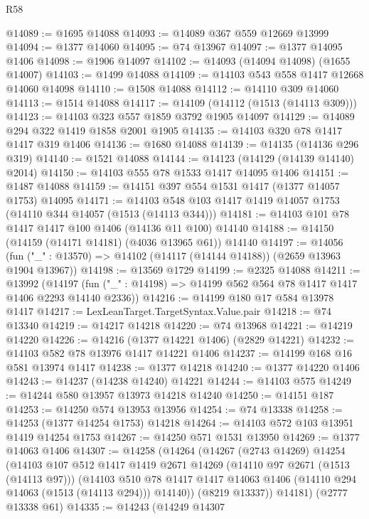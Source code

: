 \begin{lexlean}{R58}
\begin{coremodule}
{{@14089 := @1695 @14088
@14093 := @14089 @367 @559 @12669 @13999
@14094 := @1377 @14060
@14095 := @74 @13967
@14097 := @1377 @14095 @1406
@14098 := @1906 @14097
@14102 := @14093 (@14094 @14098) (@1655 @14007)
@14103 := @1499 @14088
@14109 := @14103 @543 @558 @1417 @12668 @14060 @14098
@14110 := @1508 @14088
@14112 := @14110 @309 @14060
@14113 := @1514 @14088
@14117 := @14109 (@14112 (@1513 (@14113 @309)))
@14123 := @14103 @323 @557 @1859 @3792 @1905 @14097
@14129 := @14089 @294 @322 @1419 @1858 @2001 @1905
@14135 := @14103 @320 @78 @1417 @1417 @319 @1406
@14136 := @1680 @14088
@14139 := @14135 (@14136 @296 @319)
@14140 := @1521 @14088
@14144 := @14123 (@14129 (@14139 @14140) @2014)
@14150 := @14103 @555 @78 @1533 @1417 @14095 @1406
@14151 := @1487 @14088
@14159 := @14151 @397 @554 @1531 @1417 (@1377 @14057 @1753) @14095
@14171 := @14103 @548 @103 @1417 @1419 @14057 @1753 (@14110 @344 @14057 (@1513 (@14113 @344)))
@14181 := @14103 @101 @78 @1417 @1417 @100 @1406 (@14136 @11 @100) @14140
@14188 := @14150 (@14159 (@14171 @14181) (@4036 @13965 @61)) @14140
@14197 := @14056 (fun ("_" : @13570) => @14102 (@14117 (@14144 @14188)) (@2659 @13963 @1904 @13967))
@14198 := @13569 @1729
@14199 := @2325 @14088
@14211 := @13992
    (@14197 (fun ("_" : @14198) => @14199 @562 @564 @78 @1417 @1417 @1406 @2293 @14140 @2336))
@14216 := @14199 @180 @17 @584 @13978 @1417
@14217 := LexLeanTarget.TargetSyntax.Value.pair
@14218 := @74 @13340
@14219 := @14217 @14218
@14220 := @74 @13968
@14221 := @14219 @14220
@14226 := @14216 (@1377 @14221 @1406) (@2829 @14221)
@14232 := @14103 @582 @78 @13976 @1417 @14221 @1406
@14237 := @14199 @168 @16 @581 @13974 @1417
@14238 := @1377 @14218
@14240 := @1377 @14220 @1406
@14243 := @14237 (@14238 @14240) @14221
@14244 := @14103 @575
@14249 := @14244 @580 @13957 @13973 @14218 @14240
@14250 := @14151 @187
@14253 := @14250 @574 @13953 @13956
@14254 := @74 @13338
@14258 := @14253 (@1377 @14254 @1753) @14218
@14264 := @14103 @572 @103 @13951 @1419 @14254 @1753
@14267 := @14250 @571 @1531 @13950
@14269 := @1377 @14063 @1406
@14307 := @14258
    (@14264
      (@14267
        (@2743 @14269)
        @14254
        (@14103
          @107
          @512
          @1417
          @1419
          @2671
          @14269
          (@14110 @97 @2671 (@1513 (@14113 @97)))
          (@14103
            @510
            @78
            @1417
            @1417
            @14063
            @1406
            (@14110 @294 @14063 (@1513 (@14113 @294)))
            @14140))
        (@8219 @13337))
      @14181)
    (@2777 @13338 @61)
@14335 := @14243
    (@14249
      @14307
}}
\end{coremodule}
\end{lexlean}
